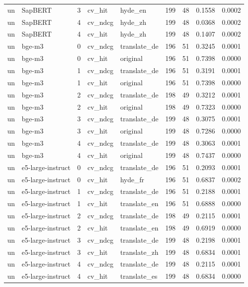 \begin{tabular}{llrllrrrr}
un & SapBERT & 3 & cv\_hit & hyde\_en & 199 & 48 & 0.1558 & 0.0002 \\
un & SapBERT & 4 & cv\_ndcg & hyde\_zh & 199 & 48 & 0.0368 & 0.0002 \\
un & SapBERT & 4 & cv\_hit & hyde\_zh & 199 & 48 & 0.1407 & 0.0002 \\
un & bge-m3 & 0 & cv\_ndcg & translate\_de & 196 & 51 & 0.3245 & 0.0001 \\
un & bge-m3 & 0 & cv\_hit & original & 196 & 51 & 0.7398 & 0.0000 \\
un & bge-m3 & 1 & cv\_ndcg & translate\_de & 196 & 51 & 0.3191 & 0.0001 \\
un & bge-m3 & 1 & cv\_hit & original & 196 & 51 & 0.7398 & 0.0000 \\
un & bge-m3 & 2 & cv\_ndcg & translate\_de & 198 & 49 & 0.3212 & 0.0001 \\
un & bge-m3 & 2 & cv\_hit & original & 198 & 49 & 0.7323 & 0.0000 \\
un & bge-m3 & 3 & cv\_ndcg & translate\_de & 199 & 48 & 0.3075 & 0.0001 \\
un & bge-m3 & 3 & cv\_hit & original & 199 & 48 & 0.7286 & 0.0000 \\
un & bge-m3 & 4 & cv\_ndcg & translate\_de & 199 & 48 & 0.3063 & 0.0001 \\
un & bge-m3 & 4 & cv\_hit & original & 199 & 48 & 0.7437 & 0.0000 \\
un & e5-large-instruct & 0 & cv\_ndcg & translate\_de & 196 & 51 & 0.2093 & 0.0001 \\
un & e5-large-instruct & 0 & cv\_hit & hyde\_fr & 196 & 51 & 0.6837 & 0.0002 \\
un & e5-large-instruct & 1 & cv\_ndcg & translate\_de & 196 & 51 & 0.2188 & 0.0001 \\
un & e5-large-instruct & 1 & cv\_hit & translate\_en & 196 & 51 & 0.6888 & 0.0000 \\
un & e5-large-instruct & 2 & cv\_ndcg & translate\_de & 198 & 49 & 0.2115 & 0.0001 \\
un & e5-large-instruct & 2 & cv\_hit & translate\_en & 198 & 49 & 0.6919 & 0.0000 \\
un & e5-large-instruct & 3 & cv\_ndcg & translate\_de & 199 & 48 & 0.2198 & 0.0001 \\
un & e5-large-instruct & 3 & cv\_hit & translate\_zh & 199 & 48 & 0.6834 & 0.0001 \\
un & e5-large-instruct & 4 & cv\_ndcg & translate\_de & 199 & 48 & 0.2115 & 0.0001 \\
un & e5-large-instruct & 4 & cv\_hit & translate\_es & 199 & 48 & 0.6834 & 0.0000 \\

\end{tabular}
